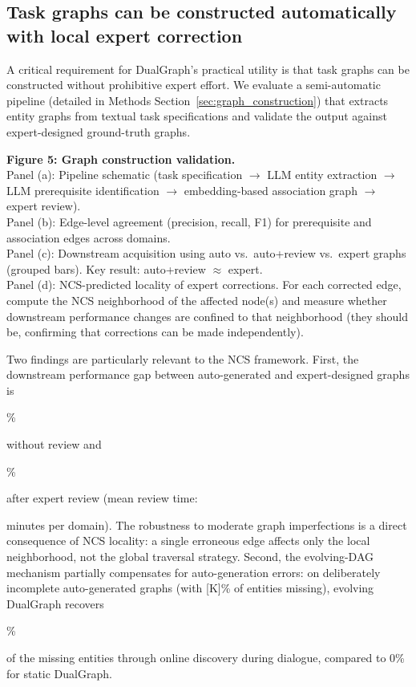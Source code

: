\documentclass[11pt,a4paper]{article}
\newcommand{\placeholder}[1]{%
  \begin{tcolorbox}[colback=yellow!10,colframe=orange!60!black,
    fonttitle=\bfseries,title=Placeholder]
    #1
  \end{tcolorbox}%
}
\begin{document}
\subsection{Task graphs can be constructed automatically with local expert
correction}
\label{sec:results_graph_construction}

A critical requirement for DualGraph's practical utility is that task graphs
can be constructed without prohibitive expert effort. We evaluate a
semi-automatic pipeline (detailed in Methods
Section~\ref{sec:graph_construction}) that extracts entity graphs from
textual task specifications and validate the output against expert-designed
ground-truth graphs.

\begin{table}[!htbp]
\centering
\caption{Semi-automatic graph construction: agreement with expert-designed
ground truth and downstream task performance. ``Auto'' uses the LLM-generated
graph without expert correction. ``Expert'' uses the manually designed graph.
``Auto+Review'' uses the auto-generated graph after expert review (mean review
time in rightmost column).}
\label{tab:graph_construction}
\small

\end{table}

\placeholder{%
  \textbf{Figure 5: Graph construction validation.}\\
  Panel (a): Pipeline schematic (task specification $\to$ LLM entity
  extraction $\to$ LLM prerequisite identification $\to$ embedding-based
  association graph $\to$ expert review).\\
  Panel (b): Edge-level agreement (precision, recall, F1) for prerequisite
  and association edges across domains.\\
  Panel (c): Downstream acquisition using auto vs.\ auto+review vs.\ expert
  graphs (grouped bars). Key result: auto+review $\approx$ expert.\\
  Panel (d): NCS-predicted locality of expert corrections. For each
  corrected edge, compute the NCS neighborhood of the affected node(s)
  and measure whether downstream performance changes are confined to that
  neighborhood (they should be, confirming that corrections can be made
  independently).
}

Two findings are particularly relevant to the NCS framework. First,
the downstream performance gap between auto-generated and expert-designed
graphs is \placeholder{[X]\%} without review and \placeholder{[Y]\%} after
expert review (mean review time: \placeholder{[Z]} minutes per domain). The
robustness to moderate graph imperfections is a direct consequence of NCS
locality: a single erroneous edge affects only the local neighborhood, not
the global traversal strategy. Second, the evolving-DAG mechanism partially
compensates for auto-generation errors: on deliberately incomplete
auto-generated graphs (with [K]\% of entities missing), evolving DualGraph
recovers \placeholder{[W]\%} of the missing entities through online
discovery during dialogue, compared to 0\% for static DualGraph.
\end{document}
